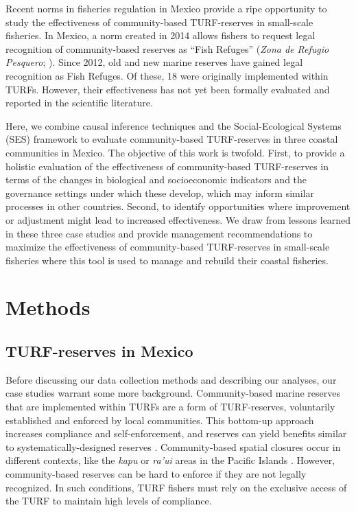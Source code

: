 \documentclass{frontiersSCNS}
\begin{document}
Recent norms in fisheries regulation in Mexico provide a ripe
opportunity to study the effectiveness of community-based TURF-reserves
in small-scale fisheries. In Mexico, a norm created in 2014 allows
fishers to request legal recognition of community-based reserves as
``Fish Refuges'' (\emph{Zona de Refugio Pesquero}; \citet{nom}). Since
2012, old and new marine reserves have gained legal recognition as Fish
Refuges. Of these, 18 were originally implemented within TURFs. However,
their effectiveness has not yet been formally evaluated and reported in
the scientific literature.

Here, we combine causal inference techniques and the Social-Ecological
Systems (SES) framework to evaluate community-based TURF-reserves in
three coastal communities in Mexico. The objective of this work is
twofold. First, to provide a holistic evaluation of the effectiveness of
community-based TURF-reserves in terms of the changes in biological and
socioeconomic indicators and the governance settings under which these
develop, which may inform similar processes in other countries. Second,
to identify opportunities where improvement or adjustment might lead to
increased effectiveness. We draw from lessons learned in these three
case studies and provide management recommendations to maximize the
effectiveness of community-based TURF-reserves in small-scale fisheries
where this tool is used to manage and rebuild their coastal fisheries.

\hypertarget{methods}{%
\section{Methods}\label{methods}}

\hypertarget{turf-reserves-in-mexico}{%
\subsection{TURF-reserves in Mexico}\label{turf-reserves-in-mexico}}

Before discussing our data collection methods and describing our
analyses, our case studies warrant some more background. Community-based
marine reserves that are implemented within TURFs are a form of
TURF-reserves, voluntarily established and enforced by local
communities. This bottom-up approach increases compliance and
self-enforcement, and reserves can yield benefits similar to
systematically-designed reserves \citep{beger_2004,smallhornwest_2018}.
Community-based spatial closures occur in different contexts, like the
\emph{kapu} or \emph{ra'ui} areas in the Pacific Islands
\citep{bohnsack_2004,johannes_2002}. However, community-based reserves
can be hard to enforce if they are not legally recognized. In such
conditions, TURF fishers must rely on the exclusive access of the TURF
to maintain high levels of compliance.
\end{document}
